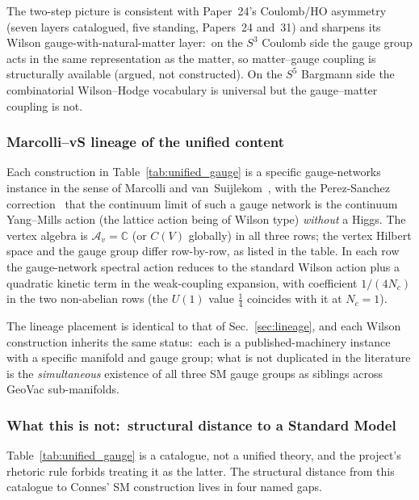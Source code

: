 \documentclass[11pt]{article}
\begin{document}
The two-step picture is consistent with Paper~24's Coulomb/HO
asymmetry (seven layers catalogued, five standing, Papers~24 and~31)
and sharpens its Wilson gauge-with-natural-matter layer:\ on the
$S^3$ Coulomb side the gauge group acts in the same
representation as the matter, so matter--gauge coupling is
structurally available (argued, not constructed).  On the $S^5$ Bargmann side the
combinatorial Wilson--Hodge vocabulary is universal but the
gauge--matter coupling is not.

\subsubsection*{Marcolli--vS lineage of the unified content}

Each construction in Table~\ref{tab:unified_gauge} is a specific
gauge-networks instance in the sense of Marcolli and
van~Suijlekom~\cite{marcolli_vs2014}, with the Perez-Sanchez
correction~\cite{perez_sanchez2025} that the continuum limit of
such a gauge network is the continuum Yang--Mills action (the lattice
action being of Wilson type) \emph{without} a Higgs.  The vertex algebra is
$\mathcal{A}_v = \mathbb{C}$ (or $C(V)$ globally) in all three rows;
the vertex Hilbert space and the gauge group differ row-by-row, as
listed in the table.  In each row the gauge-network spectral action
reduces to the standard Wilson action plus a quadratic kinetic term
in the weak-coupling expansion, with coefficient $1/(4 N_c)$ in the
two non-abelian rows (the $U(1)$ value $\tfrac14$ coincides with it at
$N_c = 1$).

The lineage placement is identical to that of
Sec.~\ref{sec:lineage}, and each Wilson construction inherits the
same status:\ each is a published-machinery instance with a
specific manifold and gauge group; what is not duplicated in the
literature is the \emph{simultaneous} existence of all three SM
gauge groups as siblings across GeoVac sub-manifolds.

\subsubsection*{What this is not:\ structural distance to a Standard Model}

Table~\ref{tab:unified_gauge} is a catalogue, not a unified theory,
and the project's rhetoric rule forbids treating it as the
latter.  The structural distance from this catalogue to Connes' SM
construction lives in four named gaps.
\end{document}
